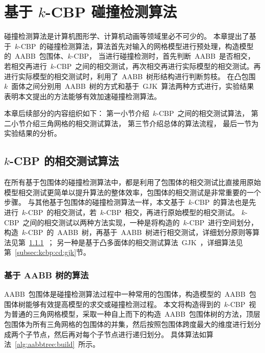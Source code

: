 

\chapter{基于 $k$-CBP 碰撞检测算法}
\label{cha:kcbp-collision-detection}

碰撞检测算法是计算机图形学、计算机动画等领域里必不可少的。
本章提出了基于~$k$-CBP~的碰撞检测算法，算法首先对输入的网格模型进行预处理，构造模型的~AABB~包围体、$k$-CBP，
当进行碰撞检测时，首先判断~AABB~是否相交，若相交再进行~$k$-CBP~之间的相交测试，再次相交再进行实际模型的相交测试。再进行实际模型的相交测试时，利用了~AABB~树形结构进行判断剪枝。
在凸包围~$k$~面体之间分别用~AABB~树的方式和基于~GJK~算法两种方式进行，实验结果表明本文提出的方法能够有效加速碰撞检测算法。

本章后续部分的内容组织如下：
第一小节介绍~$k$-CBP~之间的相交测试算法，
第二小节介绍三角网格的相交测试算法，
第三节介绍总体的算法流程，
最后一节为实验结果的分析。


\section{$k$-CBP 的相交测试算法}
\label{sec:kcbp:cd}

在所有基于包围体的碰撞检测算法中，都是利用了包围体的相交测试比直接用原始模型相交测试更简单以提升算法的整体效率，包围体的相交测试是非常重要的一个步骤。
与其他基于包围体的碰撞检测算法一样，本文基于~$k$-CBP~的算法也是先进行~$k$-CBP~的相交测试，若~$k$-CBP~相交，再进行原始模型的相交测试。
$k$-CBP~之间的相交测试以两种方法实现，一种是将构造的~$k$-CBP~进行空间划分，构造~$k$-CBP~的~AABB~树，再基于~AABB~树进行相交测试，详细划分原则等算法见第~\ref{subsec:kcbp:cd:aabb}~；
另一种是基于凸多面体的相交测试算法~GJK~，详细算法见第~\ref{subsec:kcbp:cd:gjk}节。

\subsection{基于 AABB 树的算法}
\label{subsec:kcbp:cd:aabb}

AABB~包围体是碰撞检测算法过程中一种常用的包围体，构造模型的~AABB~包围体树能够有效提高模型的求交或碰撞检测过程。
本文将构造得到的~$k$-CBP~视为普通的三角网格模型，采取一种自上而下的构造~AABB~包围体树的方法，顶层包围体为所有三角网格的包围体的并集，然后按照包围体跨度最大的维度进行划分成两个子节点，然后再对每个子节点进行递归划分。
具体算法如算法~\ref{alg:aabbtree:build}~所示。

